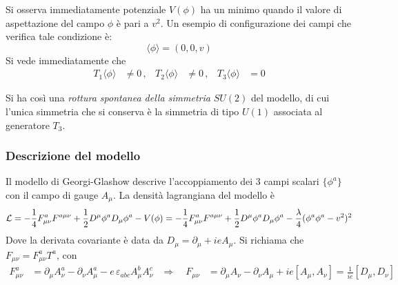 Si osserva immediatamente potenziale $V(\phi)$ ha un minimo quando il valore di
aspettazione del campo $\phi$ è pari a $v^2$. Un esempio di configurazione dei
campi che verifica tale condizione è:
   $$ \langle \phi \rangle = (0,0,v) $$
Si vede immediatamente che
\begin{equation}
   \begin{aligned}
      T_1 \langle \phi \rangle & \neq 0 \, , &
      T_2 \langle \phi \rangle & \neq 0 \, , &
      T_3 \langle \phi \rangle & = 0
   \end{aligned}
\end{equation}

Si ha così una \emph{rottura spontanea della simmetria} $SU(2)$ del modello, di cui l'unica
simmetria che si conserva è la simmetria di tipo $U(1)$ associata al generatore $T_3$.\\
\subsubsection{Descrizione del modello}
Il modello di Georgi-Glashow descrive l'accoppiamento dei 3 campi scalari
$\{\phi^a\}$ con il campo di gauge $A_\mu$. La densità lagrangiana del modello è
\begin{equation}
   \mathcal{L} = - \frac{1}{4} F^a_{\mu\nu}F^{a\mu\nu}
                 + \frac{1}{2} D^\mu\phi^a D_\mu \phi^a - V(\phi)
               = - \frac{1}{4} F^a_{\mu\nu}F^{a\mu\nu}
                 + \frac{1}{2} D^\mu\phi^a D_\mu \phi^a
                 - \frac{\lambda}{4}( \phi^a\phi^a - v^2 )^2
\end{equation}
Dove la derivata covariante è data da $D_\mu = \partial _\mu + ie A_\mu$.
Si richiama che $F_{\mu\nu} = F^a_{\mu\nu} T^a$, con
\begin{equation}
   \begin{aligned}
   F^a_{\mu\nu} & = \partial _\mu A_\nu^a - \partial _\nu A^a_\mu
                   - e \, \varepsilon_{abc} A_\mu^b A_\nu^c
   & \Rightarrow \quad
   F_{\mu\nu}  & = \partial _\mu A_\nu - \partial _\nu A_\mu + ie [A_\mu,A_\nu]
                = \frac{1}{ie}[D_\mu , D_\nu]
  \end{aligned}
\end{equation}

